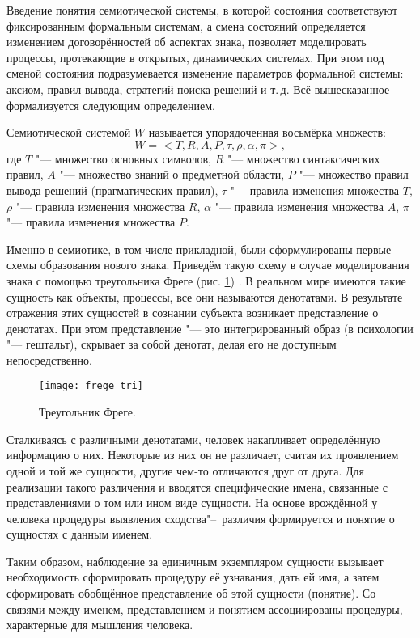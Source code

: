 Введение понятия семиотической системы, в которой состояния соответствуют фиксированным формальным системам, а смена состояний определяется изменением договорённостей об аспектах знака, позволяет моделировать процессы, протекающие в открытых, динамических системах. При этом под сменой состояния подразумевается изменение параметров формальной системы: аксиом, правил вывода, стратегий поиска решений и т.\,д. Всё вышесказанное формализуется следующим определением.

\begin{Def}
	Семиотической системой $W$ называется упорядоченная восьмёрка множеств:
	\[
		W=<T,R,A,P,\tau,\rho,\alpha,\pi>,
	\] 
	где	$T$ "--- множество основных символов, $R$ "--- множество синтаксических правил, $A$ "--- множество знаний о предметной области, $P$ "--- множество правил вывода решений (прагматических правил), $\tau$ "--- правила изменения множества $T$, $\rho$ "--- правила изменения множества $R$, $\alpha$ "--- правила изменения множества $A$, $\pi$ "--- правила изменения множества $P$.
\end{Def}

Именно в семиотике, в том числе прикладной, были сформулированы первые схемы образования нового знака. Приведём такую схему в случае моделирования знака с помощью треугольника Фреге (рис. \ref{fg:frege_sign}) \cite{Frege2000,Pirs2000}. В реальном мире имеются такие сущность как объекты, процессы, все они называются денотатами. В результате отражения этих сущностей в сознании субъекта возникает представление о денотатах. При этом представление "--- это интегрированный образ (в психологии "--- гештальт), скрывает за собой денотат, делая его не доступным непосредственно.

\begin{figure}[h]
	\centering
	\texttt{[image: frege\_tri]}
	\caption{Треугольник Фреге.}
	\label{fg:frege_sign}
\end{figure}

Сталкиваясь с различными денотатами, человек накапливает определённую информацию о них. Некоторые из них он не различает, считая их проявлением одной и той же сущности, другие чем-то отличаются друг от друга. Для реализации такого различения и вводятся специфические имена, связанные с представлениями о том или ином виде сущности. На основе врождённой у человека процедуры выявления сходства"--~различия формируется и понятие о сущностях с данным именем.

Таким образом, наблюдение за единичным экземпляром сущности вызывает необходимость сформировать процедуру её узнавания, дать ей имя, а затем сформировать обобщённое представление об этой сущности (понятие). Со связями между именем, представлением и понятием ассоциированы процедуры, характерные для мышления человека.

